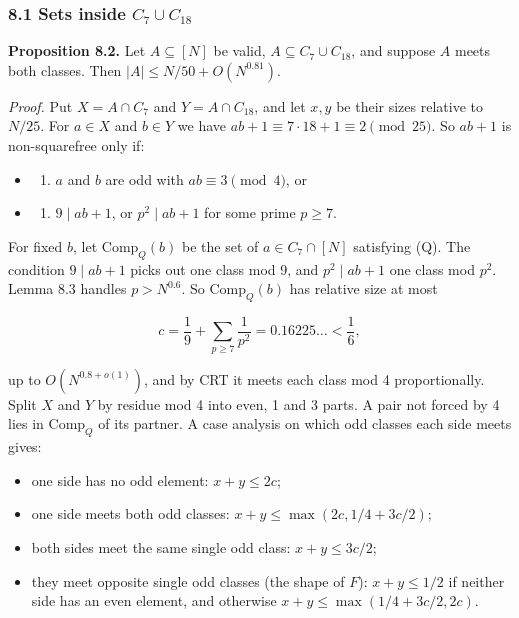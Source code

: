 \documentclass[
  11pt,
]{article}
\providecommand{\tightlist}{%
  \setlength{\itemsep}{0pt}\setlength{\parskip}{0pt}}
\begin{document}
\subsubsection{\texorpdfstring{8.1 Sets inside
\(C_7 \cup C_{18}\)}{8.1 Sets inside C\_7 \textbackslash cup C\_\{18\}}}

\textbf{Proposition 8.2.} Let \(A \subseteq [N]\) be valid,
\(A \subseteq C_7 \cup C_{18}\), and suppose \(A\) meets both classes.
Then \(|A| \le N/50 + O(N^{0.81})\).

\emph{Proof.} Put \(X = A \cap C_7\) and \(Y = A \cap C_{18}\), and let
\(x, y\) be their sizes relative to \(N/25\). For \(a \in X\) and
\(b \in Y\) we have \(ab + 1 \equiv 7\cdot 18 + 1 \equiv 2 \pmod{25}\).
So \(ab + 1\) is non-squarefree only if:

\begin{itemize}
\item
  \begin{enumerate}
  \def\labelenumi{(\arabic{enumi})}
  \setcounter{enumi}{3}
  \tightlist
  \item
    \(a\) and \(b\) are odd with \(ab \equiv 3 \pmod{4}\), or
  \end{enumerate}
\item
  \begin{enumerate}
  \def\labelenumi{(\Alph{enumi})}
  \setcounter{enumi}{16}
  \tightlist
  \item
    \(9 \mid ab + 1\), or \(p^2 \mid ab + 1\) for some prime
    \(p \ge 7\).
  \end{enumerate}
\end{itemize}

For fixed \(b\), let \(\mathrm{Comp}_Q(b)\) be the set of
\(a \in C_7 \cap [N]\) satisfying (Q). The condition \(9 \mid ab + 1\)
picks out one class mod 9, and \(p^2 \mid ab + 1\) one class mod
\(p^2\). Lemma 8.3 handles \(p > N^{0.6}\). So \(\mathrm{Comp}_Q(b)\)
has relative size at most

\[c = \frac19 + \sum_{p\ge 7}\frac1{p^2} = 0.16225\ldots < \frac16,\]

up to \(O(N^{0.8+o(1)})\), and by CRT it meets each class mod 4
proportionally. Split \(X\) and \(Y\) by residue mod 4 into even, 1 and
3 parts. A pair not forced by 4 lies in \(\mathrm{Comp}_Q\) of its
partner. A case analysis on which odd classes each side meets gives:

\begin{itemize}
\tightlist
\item
  one side has no odd element: \(x + y \le 2c\);
\item
  one side meets both odd classes: \(x + y \le \max(2c, 1/4 + 3c/2)\);
\item
  both sides meet the same single odd class: \(x + y \le 3c/2\);
\item
  they meet opposite single odd classes (the shape of \(F\)):
  \(x + y \le 1/2\) if neither side has an even element, and otherwise
  \(x + y \le \max(1/4 + 3c/2, 2c)\).
\end{itemize}
\end{document}
